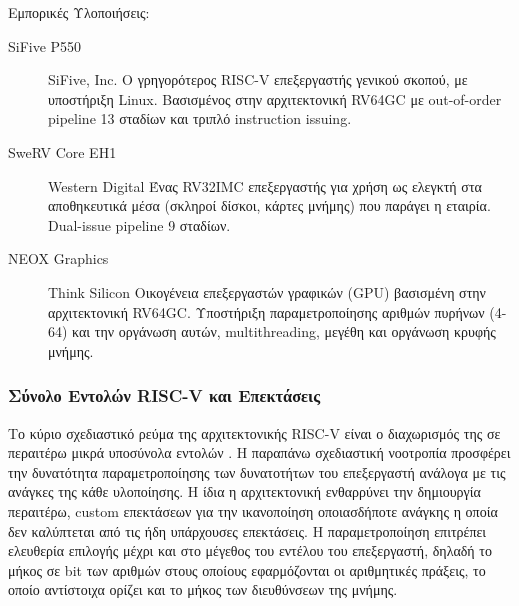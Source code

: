 \documentclass[11pt]{extarticle}
\begin{document}
Εμπορικές Υλοποιήσεις:
\begin{description}
    \item [SiFive P550] SiFive, Inc. \cite{p550}\newline
    Ο γρηγορότερος RISC-V επεξεργαστής γενικού σκοπού, με υποστήριξη Linux. 
    Βασισμένος στην αρχιτεκτονική RV64GC με out-of-order pipeline 13 σταδίων και τριπλό instruction issuing.
    \item [SweRV Core EH1] Western Digital\cite{swerv} \newline
    Ένας RV32IMC επεξεργαστής για χρήση ως ελεγκτή στα αποθηκευτικά μέσα (σκληροί δίσκοι, κάρτες μνήμης) που παράγει η εταιρία.
    Dual-issue pipeline 9 σταδίων.
    \item [NEOX Graphics] Think Silicon\cite{neox} \newline
    Οικογένεια επεξεργαστών γραφικών (GPU) βασισμένη στην αρχιτεκτονική RV64GC.
    Υποστήριξη παραμετροποίησης αριθμών πυρήνων (4-64) και την οργάνωση αυτών, multithreading, μεγέθη και οργάνωση κρυφής μνήμης.
\end{description}

\subsubsection{Σύνολο Εντολών RISC-V και Επεκτάσεις}
Το κύριο σχεδιαστικό ρεύμα της αρχιτεκτονικής RISC-V είναι ο διαχωρισμός της σε περαιτέρω μικρά υποσύνολα εντολών \cite{spec}.
Η παραπάνω σχεδιαστική νοοτροπία προσφέρει την δυνατότητα παραμετροποίησης των δυνατοτήτων του επεξεργαστή ανάλογα με τις ανάγκες της κάθε υλοποίησης.
Η ίδια η αρχιτεκτονική ενθαρρύνει την δημιουργία περαιτέρω, custom επεκτάσεων για την ικανοποίηση οποιασδήποτε ανάγκης η οποία δεν καλύπτεται από τις ήδη υπάρχουσες επεκτάσεις.
Η παραμετροποίηση επιτρέπει ελευθερία επιλογής μέχρι και στο μέγεθος του εντέλου του επεξεργαστή, δηλαδή το μήκος σε bit των αριθμών στους οποίους εφαρμόζονται οι αριθμητικές πράξεις, το οποίο αντίστοιχα ορίζει και το μήκος των διευθύνσεων της μνήμης. 
\end{document}
